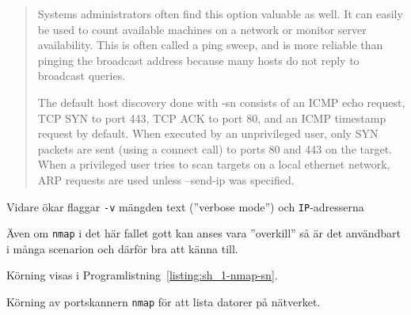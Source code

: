 \begin{quotation}
Systems administrators often find this option valuable as well. It can easily
be used to count available machines on a network or monitor server
availability. This is often called a ping sweep, and is more reliable than
pinging the broadcast address because many hosts do not reply to broadcast
queries.

The default host discovery done with -sn consists of an ICMP echo request, TCP
SYN to port 443, TCP ACK to port 80, and an ICMP timestamp request by default.
When executed by an unprivileged user, only SYN packets are sent (using a
connect call) to ports 80 and 443 on the target. When a privileged user tries
to scan targets on a local ethernet network, ARP requests are used unless
--send-ip was specified. 
\end{quotation}

Vidare ökar flaggar \texttt{-v} mängden text (''verbose mode'') och 
\texttt{IP}-adresserna 


Även om \texttt{nmap} i det här fallet gott kan anses vara ''overkill'' så är
det användbart i många scenarion och därför bra att känna till.

Körning visas i Programlistning~\ref{listing:sh_1-nmap-sn}.

\begin{listing}[H]
  \caption{Körning av portskannern \texttt{nmap} för att lista datorer på
           nätverket.}
  \label{listing:sh_1-nmap-sn}
\end{listing}
